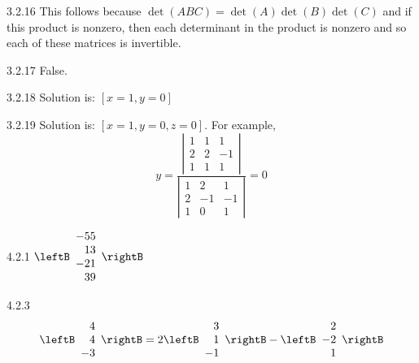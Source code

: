 \begin{Answer}{3.2.16}
This follows
because $\det \left( ABC\right) =\det \left( A\right) \det \left( B\right)
\det \left( C\right) $ and if this product is nonzero, then each determinant
in the product is nonzero and so each of these matrices is invertible.
\end{Answer}
\begin{Answer}{3.2.17}
False.
\end{Answer}
\begin{Answer}{3.2.18}
Solution is: $\left[ x=1,y=0\right] $
\end{Answer}
\begin{Answer}{3.2.19}
Solution is: $\left[ x=1,y=0,z=0\right] .$ For example,
\[
y=\frac{\left\vert
\begin{array}{rrr}
1 & 1 & 1 \\
2 & 2 & -1 \\
1 & 1 & 1
\end{array}
\right\vert }{\left\vert
\begin{array}{rrr}
1 & 2 & 1 \\
2 & -1 & -1 \\
1 & 0 & 1
\end{array}
\right\vert }=0
\]
\end{Answer}
\begin{Answer}{4.2.1}
$\leftB
\begin{array}{r}
-55 \\
13 \\
-21 \\
39
\end{array}
\rightB$
\end{Answer}
\begin{Answer}{4.2.3}
\begin{equation*}
\leftB
\begin{array}{r}
4 \\
4 \\
-3
\end{array}
\rightB
=
2
\leftB
\begin{array}{r}
3 \\
1 \\
-1
\end{array}
\rightB
-
\leftB
\begin{array}{r}
2 \\
-2\\
1
\end{array}
\rightB
\end{equation*}
\end{Answer}
